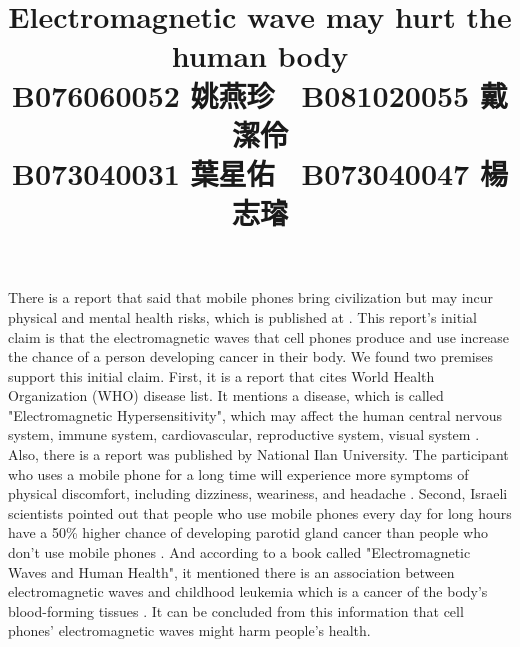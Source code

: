 \documentclass[a4paper, 12pt]{article}
\title{Electromagnetic wave may hurt the human body\\
\small
B076060052 姚燕珍 \ B081020055 戴潔伶\\
B073040031 葉星佑 \ B073040047 楊志璿
}
\date{}
\begin{document}
\begin{CJK*}{UTF8}{bsmi}
    \maketitle

    There is a report that said that mobile phones
    bring civilization but may incur physical and mental health
    risks, which is published at \parencite{AIA970701}. This
    report's initial claim is that the electromagnetic waves
    that cell phones produce and use increase the chance of a
    person developing cancer in their body. We found two premises
    support this initial claim. First, it is a report that cites
    World Health Organization (WHO) disease list. It mentions
    a disease, which is called "Electromagnetic Hypersensitivity",
    which may affect the human central nervous system, immune
    system, cardiovascular, reproductive system, visual
    system \parencite{36069} . Also, there is a report was published
    by National Ilan University. The participant who uses a mobile
    phone for a long time will experience more symptoms of
    physical discomfort, including dizziness, weariness, and
    headache \parencite{R9631008} .
    Second, Israeli scientists
    pointed out that people who use mobile phones every day
    for long hours have a 50\% higher chance of developing
    parotid gland cancer than people who don't use mobile phones
    \parencite{10.1093/aje/kwm325}. And according to a book
    called "Electromagnetic Waves and Human Health", it
    mentioned there is an association between electromagnetic
    waves and childhood leukemia which is a cancer of the body's
    blood-forming tissues \parencite{16094} .
    It can be concluded from this information that cell
    phones' electromagnetic waves might harm people's health.
    \\


\end{CJK*}
\end{document}
